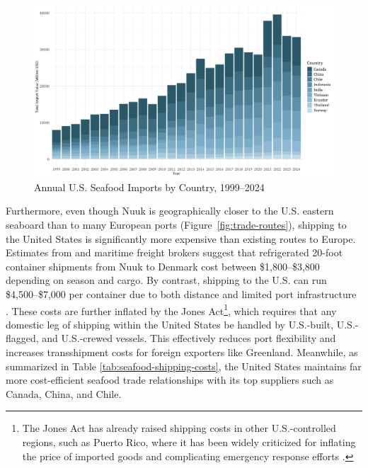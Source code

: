\documentclass{adonis}
\begin{document}
    \begin{figure}[H]
        \centering
        \includegraphics[width=0.90\linewidth]{images/seafood_imports_by_country.png}
        \caption{Annual U.S. Seafood Imports by Country, 1999–2024 \citep{usda2025foodimports}}
        \label{fig:seafood-imports}
    \end{figure}
    
    Furthermore, even though Nuuk is geographically closer to the U.S. eastern seaboard than to many European ports (Figure~\ref{fig:trade-routes}), shipping to the United States is significantly more expensive than existing routes to Europe. Estimates from \citet{royalarcticline2024freight} and maritime freight brokers suggest that refrigerated 20-foot container shipments from Nuuk to Denmark cost between \$1,800–\$3,800 depending on season and cargo. By contrast, shipping to the U.S. can run \$4,500–\$7,000 per container due to both distance and limited port infrastructure \citep{intlvanlines2024shipping}. These costs are further inflated by the Jones Act\footnote{The Jones Act has already raised shipping costs in other U.S.-controlled regions, such as Puerto Rico, where it has been widely criticized for inflating the price of imported goods and complicating emergency response efforts \citep{rivera2018hard}.}, which requires that any domestic leg of shipping within the United States be handled by U.S.-built, U.S.-flagged, and U.S.-crewed vessels. This effectively reduces port flexibility and increases transshipment costs for foreign exporters like Greenland. Meanwhile, as summarized in Table \ref{tab:seafood-shipping-costs}, the United States maintains far more cost-efficient seafood trade relationships with its top suppliers such as Canada, China, and Chile. 
\end{document}
